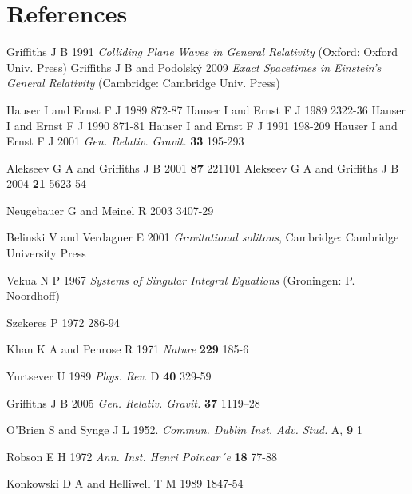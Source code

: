 \documentclass[12pt]{iopart}
\begin{document}
\section*{References}
\begin{thebibliography}{1}
 Griffiths J B 1991 {\it Colliding Plane Waves in General Relativity} (Oxford: Oxford Univ. Press) %
 Griffiths J B and Podolsk\'y 2009 {\it Exact Spacetimes in Einstein's General Relativity}  (Cambridge: Cambridge Univ. Press)

 Hauser I and Ernst F J 1989  872-87 
 Hauser I and Ernst F J 1989  2322-36 
 Hauser I and Ernst F J 1990  871-81 
 Hauser I and Ernst F J 1991  198-209
 Hauser I and Ernst F J 2001 {\it Gen. Relativ. Gravit.} {\bf 33} 195-293 

 Alekseev G A and Griffiths J B 2001 {\it \PRL} {\bf 87} 221101
 Alekseev G A and Griffiths J B 2004 {\it \CQG} {\bf 21} 5623-54

 Neugebauer G and Meinel R 2003  3407-29

 Belinski V and Verdaguer E 2001 {\it Gravitational solitons}, Cambridge: Cambridge University Press

 Vekua N P 1967 {\it Systems of Singular Integral Equations}  (Groningen: P. Noordhoff)

 Szekeres P 1972  286-94

 Khan K A and Penrose R 1971 {\it Nature} {\bf 229} 185-6

 Yurtsever U 1989 {\it Phys. Rev.} D {\bf 40} 329-59

 Griffiths J B 2005 {\it Gen. Relativ. Gravit.} {\bf 37} 1119–28

 O’Brien S and Synge J L 1952.  {\it Commun. Dublin Inst. Adv. Stud.} A, {\bf 9} 1

 Robson E H 1972 {\it Ann. Inst. Henri Poincar´e} {\bf 18} 77-88

 Konkowski D A and Helliwell T M 1989  1847-54


\end{thebibliography}
\end{document}
